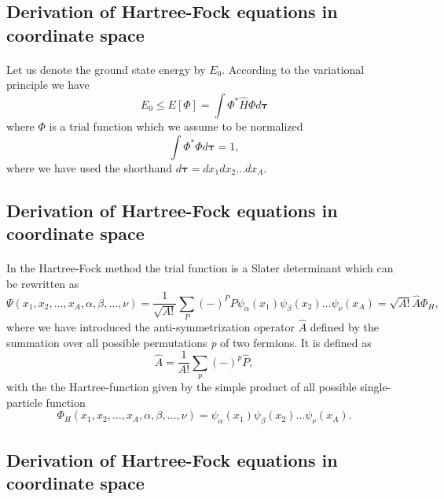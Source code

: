 \documentclass[%
twoside,                 %
final,                   %
10pt]{article}
\begin{document}
\subsection*{Derivation of Hartree-Fock equations in coordinate space}

\paragraph{}
Let us denote the ground state energy by $E_0$. According to the
variational principle we have
\[
  E_0 \le E[\Phi] = \int \Phi^*\hat{H}\Phi d\mathbf{\tau}
\]
where $\Phi$ is a trial function which we assume to be normalized
\[
  \int \Phi^*\Phi d\mathbf{\tau} = 1,
\]
where we have used the shorthand $d\mathbf{\tau}=dx_1dx_2\dots dx_A$.



\subsection*{Derivation of Hartree-Fock equations in coordinate space}

\paragraph{}
In the Hartree-Fock method the trial function is a Slater
determinant which can be rewritten as 
\[
  \Psi(x_1,x_2,\dots,x_A,\alpha,\beta,\dots,\nu) = \frac{1}{\sqrt{A!}}\sum_{P} (-)^PP\psi_{\alpha}(x_1)
    \psi_{\beta}(x_2)\dots\psi_{\nu}(x_A)=\sqrt{A!}\hat{A}\Phi_H,
\]
where we have introduced the anti-symmetrization operator $\hat{A}$ defined by the 
summation over all possible permutations \emph{p} of two fermions.
It is defined as
\[
  \hat{A} = \frac{1}{A!}\sum_{p} (-)^p\hat{P},
\]
with the the Hartree-function given by the simple product of all possible single-particle function
\[
  \Phi_H(x_1,x_2,\dots,x_A,\alpha,\beta,\dots,\nu) =
  \psi_{\alpha}(x_1)
    \psi_{\beta}(x_2)\dots\psi_{\nu}(x_A).
\]






\subsection*{Derivation of Hartree-Fock equations in coordinate space}

\end{document}
